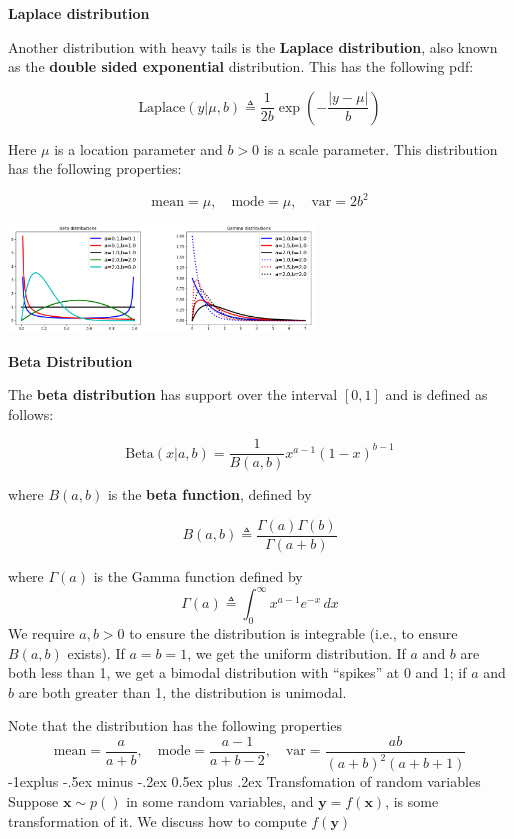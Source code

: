 \documentclass[10pt,landscape]{article}
\makeatletter
\newcommand{\inp}{\textbf{x}}
\newcommand{\out}{\textbf{y}}
\renewcommand{\subsection}{\@startsection{subsection}{2}{0mm}%
                                {-1explus -.5ex minus -.2ex}%
                                {0.5ex plus .2ex}%
                                {\normalfont\normalsize\bfseries}}
\makeatother
\begin{document}
\begin{multicols*}{3}
\textbf{Laplace distribution}

Another distribution with heavy tails is the \textbf{Laplace distribution}, also known as the \textbf{double sided exponential} distribution. This has the following pdf:

\[
\text{Laplace}(y | \mu, b) \triangleq \frac{1}{2b} \exp \left( -\frac{|y - \mu|}{b} \right)
\]

Here $\mu$ is a location parameter and $b > 0$ is a scale parameter. This distribution has the following properties:

\[
\text{mean} = \mu, \quad \text{mode} = \mu, \quad \text{var} = 2b^2
\]
\begin{minipage}{\linewidth}
    \centering
    \includegraphics[width=3.2in]{figures/beta-gamma-distribution.PNG}
\end{minipage}
\textbf{Beta Distribution}

The \textbf{beta distribution} has support over the interval $[0,1]$ and is defined as follows:

\[
\text{Beta}(x | a, b) = \frac{1}{B(a, b)} x^{a-1} (1 - x)^{b-1} 
\]

where $B(a, b)$ is the \textbf{beta function}, defined by

\[
B(a, b) \triangleq \frac{\Gamma(a) \Gamma(b)}{\Gamma(a + b)} 
\]

where $\Gamma(a)$ is the Gamma function defined by
\[
\Gamma(a) \triangleq \int_{0}^{\infty} x^{a-1} e^{-x} \,dx 
\]
We require $a, b > 0$ to ensure the distribution is integrable (i.e., to ensure $B(a, b)$ exists). If $a = b = 1$, we get the uniform distribution. If $a$ and $b$ are both less than 1, we get a bimodal distribution with ``spikes'' at 0 and 1; if $a$ and $b$ are both greater than 1, the distribution is unimodal.

Note that the distribution has the following properties
\[
    \text{mean} = \frac{a}{a+b}, \quad \text{mode} = \frac{a-1}{a+b-2}, \quad \text{var} = \frac{ab}{(a+b)^2(a+b+1)}
\]
\subsection{Transfomation of random variables}
Suppose $\inp\sim p()$ in some random variables, and $\out=f(\inp)$, is some transformation of it. We discuss how to compute $f(\out)$


\end{multicols*}
\end{document}
